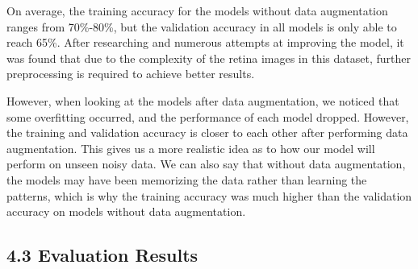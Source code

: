 \documentclass[
]{article}
\begin{document}
On average, the training accuracy for the models without data
augmentation ranges from 70\%-80\%, but the validation accuracy in all
models is only able to reach 65\%. After researching and numerous
attempts at improving the model, it was found that due to the complexity
of the retina images in this dataset, further preprocessing is required
to achieve better results.

However, when looking at the models after data augmentation, we noticed
that some overfitting occurred, and the performance of each model
dropped. However, the training and validation accuracy is closer to each
other after performing data augmentation. This gives us a more realistic
idea as to how our model will perform on unseen noisy data. We can also
say that without data augmentation, the models may have been memorizing
the data rather than learning the patterns, which is why the training
accuracy was much higher than the validation accuracy on models without
data augmentation.

\hypertarget{evaluation-results}{%
\subsection{\texorpdfstring{\textbf{4.3 Evaluation
Results}}{4.3 Evaluation Results}}\label{evaluation-results}}
\end{document}
